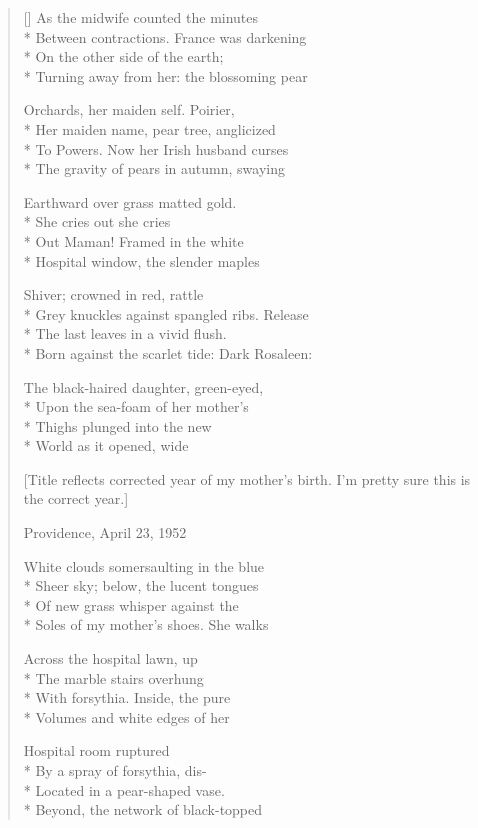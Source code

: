 \begin{verse}[\versewidth]
As the midwife counted the minutes\\*
Between contractions.   France was darkening\\*
On the other side of the earth;\\*
Turning away from her: the blossoming pear

Orchards, her maiden self. Poirier,\\*
Her maiden name, pear tree, anglicized\\*
To Powers. Now her Irish husband curses\\*
The gravity of pears in autumn, swaying

Earthward over grass matted gold.\\*
She cries out she cries\\*
Out Maman!      Framed in the white\\*
Hospital window, the slender maples

Shiver; crowned in red, rattle\\*
Grey knuckles against spangled ribs.    Release\\*
The last leaves in a vivid flush.\\*
Born against the scarlet tide: Dark Rosaleen:

The black-haired daughter, green-eyed,\\*
Upon the sea-foam of her mother's\\*
Thighs plunged into the new\\*
World as it opened, wide

[Title reflects corrected year of my mother's birth. I'm  pretty sure this is the correct year.]

Providence, April 23, 1952

White clouds somersaulting in the blue\\*
Sheer sky; below, the lucent tongues\\*
Of new grass whisper against the\\*
Soles of my mother's shoes.     She walks

Across the hospital lawn, up\\*
The marble stairs overhung\\*
With forsythia.    Inside, the pure\\*
Volumes and white edges of her

Hospital room ruptured\\*
By a spray of forsythia, dis-\\*
Located in a pear-shaped vase.\\*
Beyond, the network of black-topped


\end{verse}
